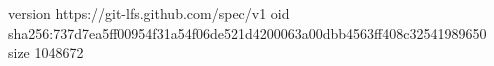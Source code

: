version https://git-lfs.github.com/spec/v1
oid sha256:737d7ea5ff00954f31a54f06de521d4200063a00dbb4563ff408c32541989650
size 1048672
